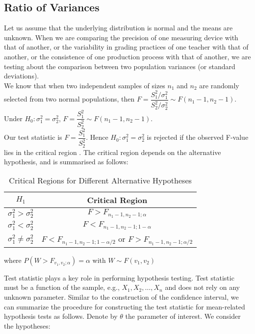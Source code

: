 \subsection{Ratio of Variances}
Let us assume that the underlying distribution is normal and the means are unknown.
When we are comparing the precision of one measuring device with that of another, or the variability in grading practices of one teacher with that of another, or the consistence of one production process with that of another, we are testing about the comparison between two population variances (or standard deviations). \\
We know that when two independent samples of sizes $n_1$ and $n_2$ are randomly selected from two normal populations, then $F = \dfrac{S_1^2/\sigma_1^2}{S_2^2/\sigma_2^2} \sim F(n_1 - 1, n_2 - 1)$. Under $H_0: \sigma_1^2 = \sigma_2^2$, $F = \dfrac{S_1^2}{S_2^2} \sim F(n_1 - 1, n_2 - 1)$. \\
Our test statistic is $F = \dfrac{S_1^2}{S_2^2}$. Hence $H_0: \sigma_1^2 = \sigma_2^2$ is rejected if the observed F-value lies in the critical region . The critical region depends on the alternative hypothesis, and is summarised as follows:
\renewcommand{\arraystretch}{1.5}
\begin{table}[h]
    \centering
    \begin{tabular}{|c|c|}
    \hline
      \textbf{$H_1$}   &  \textbf{Critical Region} \\
      \hline
        $\sigma_1^2 > \sigma_2^2$ & $F > F_{n_1 - 1, n_2 - 1; \alpha}$ \\
      \hline
        $\sigma_1^2 < \sigma_2^2$ & $F < F_{n_1 - 1, n_2 - 1; 1 - \alpha}$ \\
      \hline
        $\sigma_1^2 \neq \sigma_2^2$ & $F < F_{n_1 - 1, n_2 - 1; 1- \alpha/2}$ or $F > F_{n_1 - 1, n_2 - 1; \alpha/2}$ \\
      \hline
    \end{tabular}
    \caption{Critical Regions for Different Alternative Hypotheses}
    \label{tab:my_label}
\end{table}
where $P(W > F_{v_1, v_2; \alpha}) = \alpha$ with $W \sim F(v_1, v_2)$
\begin{note}
\end{note}
Test statistic plays a key role in performing hypothesis testing. Test statistic must be a function of the sample, e.g., $X_1, X_2, \dots, X_n$ and does not rely on any unknown parameter. Similar to the construction of the confidence interval, we can summarize the procedure for constructing the test statistic for mean-related hypothesis tests as follows. Denote by $\theta$ the parameter of interest. We consider the hypotheses:
